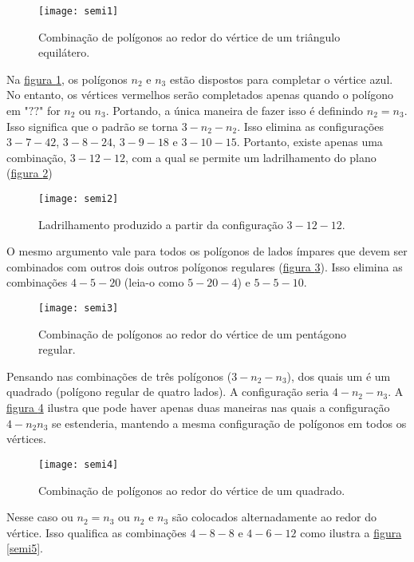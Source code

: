 \begin{figure}[H]
\centering
\texttt{[image: semi1]}
\caption{Combinação de polígonos ao redor do vértice de um triângulo equilátero.}
\label{semi1}
\end{figure}

Na \hyperref[semi1]{figura \ref{semi1}}, os polígonos $n_2$ e $n_3$ estão dispostos para completar o vértice azul. No entanto, os vértices vermelhos serão completados apenas quando o polígono em "$??$" for $n_2$ ou $n_3$. Portando, a única maneira de fazer isso é definindo $n_2 = n_3$. Isso significa que o padrão se torna $3-n_2- n_2$. 
Isso elimina as configurações $3-7-42$, $3-8-24$, $3-9-18$ e $3-10-15$. Portanto, existe apenas uma combinação, $3-12-12$, com a qual se permite um ladrilhamento do plano (\hyperref[semi2]{figura \ref{semi2}})

\begin{figure}[H]
\centering
\texttt{[image: semi2]}
\caption{Ladrilhamento produzido a partir da configuração $3-12-12$.}
\label{semi2}
\end{figure}

O mesmo argumento vale para todos os polígonos de lados ímpares que devem ser combinados com outros dois outros polígonos regulares (\hyperref[semi3]{figura \ref{semi3}}). Isso elimina as combinações $4-5-20$ (leia-o como $5-20-4$) e $5-5-10$.


\begin{figure}[H]
\centering
\texttt{[image: semi3]}
\caption{Combinação de polígonos ao redor do vértice de um pentágono regular.}
\label{semi3}
\end{figure}

Pensando nas combinações de três polígonos ($3-n_2-n_3$), dos quais um é um quadrado (polígono regular de quatro lados). A  configuração seria $4-n_2-n_3$. A \hyperref[semi4]{figura \ref{semi4}} ilustra que pode haver apenas duas maneiras nas quais a configuração $4-n_2n_3$ se estenderia, mantendo a mesma configuração de polígonos em todos os vértices. 

\begin{figure}[H]
\centering
\texttt{[image: semi4]}
\caption{Combinação de polígonos ao redor do vértice de um quadrado.}
\label{semi4}
\end{figure}

Nesse caso ou $n_2= n_3$ ou $n_2$ e $n_3$ são colocados alternadamente ao redor do vértice. Isso qualifica as combinações $4-8-8$ e $4-6-12$ como ilustra a \hyperref[semi5]{figura \ref{semi5}}.

